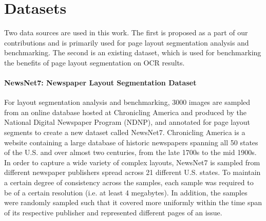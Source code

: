 \documentclass[letterpaper]{article} %
\begin{document}

\section{Datasets}
Two data sources are used in this work. The first is proposed as a part of our contributions and is primarily used for page layout segmentation analysis and benchmarking. The second is an existing dataset, which is used for benchmarking the benefits of page layout segmentation on OCR results.


\paragraph{NewsNet7: Newspaper Layout Segmentation Dataset}
For layout segmentation analysis and benchmarking, 3000 images are sampled from an online database hosted at Chronicling America and produced by the National Digital Newspaper Program (NDNP), and annotated for page layout segments to create a new dataset called NewsNet7. Chronicling America is a website containing a large database of historic newspapers spanning all 50 states of the U.S. and over almost two centuries, from the late 1700s to the mid 1900s. In order to capture a wide variety of complex layouts, NewsNet7 is sampled from different newspaper publishers spread across 21 different U.S. states. To maintain a certain degree of consistency across the samples, each sample was required to be of a certain resolution (i.e. at least 4 megabytes). In addition, the samples were randomly sampled such that it covered more uniformly within the time span of its respective publisher and represented different pages of an issue. 
\end{document}
